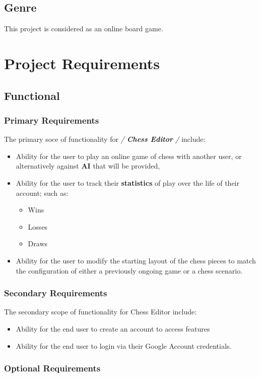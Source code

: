 \documentclass[11pt]{article}
\begin{document}
\subsection{Genre}
\label{sec:org8d77c67}
This project is considered as an online board game.
\section{Project Requirements}
\label{sec:org424121c}
\subsection{Functional}
\label{sec:orgee89f7c}
\subsubsection{Primary Requirements}
\label{sec:orgbe5a75f}
The primary soce of functionality for \emph{/ \textbf{Chess Editor} /} include:
\begin{itemize}
\item Ability for the user to play an online game of chess with
another user, or alternatively against \textbf{AI} that will be
provided,
\item Ability for the user to track their \textbf{statistics} of play over
the life of their account; such as:
\begin{itemize}
\item Wins
\item Losses
\item Draws
\end{itemize}
\item Ability for the user to modify the starting layout of the chess
pieces to match the configuration of either a previously ongoing
game or a chess scenario.
\end{itemize}
\subsubsection{Secondary Requirements}
\label{sec:orgbea8ecf}
The secondary scope of functionality for Chess Editor include:
\begin{itemize}
\item Ability for the end user to create an account to access features
\item Ability for the end user to login via their Google Account credentials.
\end{itemize}
\subsubsection{Optional Requirements}
\label{sec:org4231056}
\end{document}
